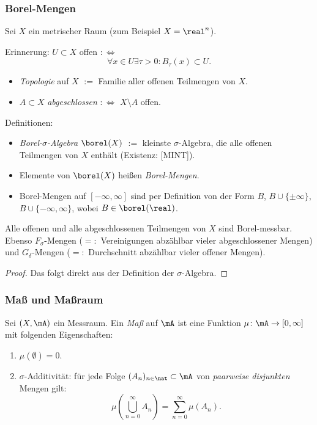 \subsubsection{Borel-Mengen}
Sei $X$ ein metrischer Raum (zum Beispiel $X = \real^n$). 

Erinnerung: $U \subset X$ offen $:\Leftrightarrow$
\[ \forall x \in U \exists \tau > 0: B_\tau(x) \subset U. \]
\begin{itemize}
 \item \emph{Topologie} auf $X$ $:=$ Familie aller offenen Teilmengen von $X$.
 \item $A \subset X$ \emph{abgeschlossen} $:\Leftrightarrow$ $X \setminus A$ offen.
\end{itemize}

Definitionen:
\begin{itemize}
 \item \emph{Borel-$\sigma$-Algebra} $\borel(X)$ $:=$ kleinste $\sigma$-Algebra, die alle offenen Teilmengen von $X$ enthält (Existenz: [MINT]).
 \item Elemente von $\borel(X)$ heißen \emph{Borel-Mengen}.
 \item Borel-Mengen auf $[-\infty,\infty]$ sind per Definition von der Form $B$, $B \cup \{ \pm \infty \}$, $B \cup \{ -\infty, \infty \}$, wobei $B \in \borel(\real)$.
\end{itemize}

\begin{rmrk}
 Alle offenen und alle abgeschlossenen Teilmengen von $X$ sind Borel-mess\-bar. Ebenso $F_\sigma$-Mengen ($=:$ Vereinigungen abzählbar vieler abgeschlossener Mengen) und $G_\delta$-Mengen ($=:$ Durchschnitt abzählbar vieler offener Mengen).
\end{rmrk}

\begin{proof}
 Das folgt direkt aus der Definition der $\sigma$-Algebra.
\end{proof}

\subsubsection{Maß und Maßraum}
Sei $(X,\mA)$ ein Messraum. Ein \emph{Maß} auf $\mA$ ist eine Funktion $\mu\colon\mA \to [0,\infty]$ mit folgenden Eigenschaften:
\begin{enumerate}
 \item $\mu(\emptyset)=0$.
 \item $\sigma$-Additivität: für jede Folge $(A_n)_{n \in \nat} \subset \mA$ von \emph{paarweise disjunkten} Mengen gilt:
 \[ \mu\left( \bigcup_{n=0}^\infty A_n \right) = \sum_{n=0}^\infty \mu(A_n). \]
\end{enumerate}

